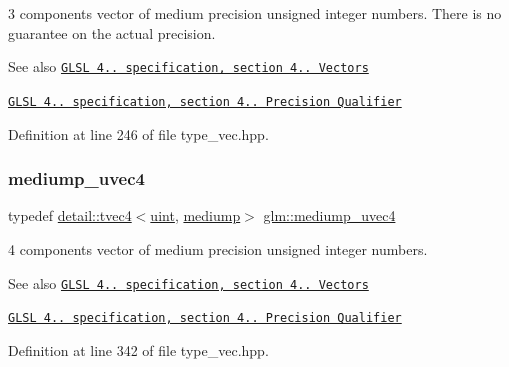 3 components vector of medium precision unsigned integer numbers. There is no guarantee on the actual precision.

\begin{DoxySeeAlso}{See also}
\href{http://www.opengl.org/registry/doc/GLSLangSpec.4.20.8.pdf}{\tt G\+L\+SL 4.. specification, section 4.. Vectors} 

\href{http://www.opengl.org/registry/doc/GLSLangSpec.4.20.8.pdf}{\tt G\+L\+SL 4.. specification, section 4.. Precision Qualifier} 
\end{DoxySeeAlso}


Definition at line 246 of file type\+\_\+vec.\+hpp.

\mbox{\label{group__core__precision_gad90c29c2643136a9bcb1165eac47c810}} 
\subsubsection{\texorpdfstring{mediump\+\_\+uvec4}{mediump\_uvec4}}
{\footnotesize\ttfamily typedef \hyperlink{structglm_1_1detail_1_1tvec4}{detail\+::tvec4}$<$\hyperlink{group__core__precision_ga4fd29415871152bfb5abd588334147c8}{uint}, \hyperlink{namespaceglm_a0f04f086094c747d227af4425893f545a6416f3ea0c9025fb21ed50c4d6620482}{mediump}$>$ \hyperlink{group__core__precision_gad90c29c2643136a9bcb1165eac47c810}{glm\+::mediump\+\_\+uvec4}}

4 components vector of medium precision unsigned integer numbers.

\begin{DoxySeeAlso}{See also}
\href{http://www.opengl.org/registry/doc/GLSLangSpec.4.20.8.pdf}{\tt G\+L\+SL 4.. specification, section 4.. Vectors} 

\href{http://www.opengl.org/registry/doc/GLSLangSpec.4.20.8.pdf}{\tt G\+L\+SL 4.. specification, section 4.. Precision Qualifier} 
\end{DoxySeeAlso}


Definition at line 342 of file type\+\_\+vec.\+hpp.

\mbox{\label{group__core__precision_ga1365858c541931eb8a7473fa85a1d1cf}} 
